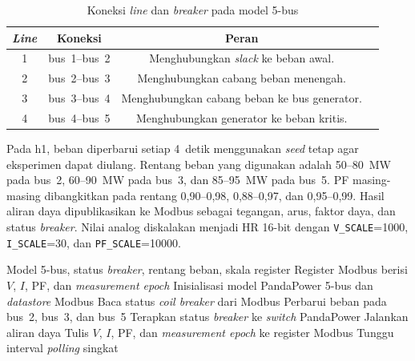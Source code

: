 \renewcommand{\arraystretch}{1.3}
\begin{table}[htbp]
    \centering
    \caption{Koneksi \textit{line} dan \textit{breaker} pada model 5-bus}
    \label{tab:line_model_5bus}
    \begin{tabular}{|c|c|c|c|}
        \hline
        \textbf{\textit{Line}} & \textbf{Koneksi} & \textbf{Peran} \\ \hline
        1 & bus~1--bus~2 & Menghubungkan \textit{slack} ke beban awal. \\ \hline
        2 & bus~2--bus~3 & Menghubungkan cabang beban menengah. \\ \hline
        3 & bus~3--bus~4 & Menghubungkan cabang beban ke bus generator. \\ \hline
        4 & bus~4--bus~5 & Menghubungkan generator ke beban kritis. \\ \hline
    \end{tabular}
\end{table}

Pada h1, beban diperbarui setiap 4~detik menggunakan \textit{seed} tetap agar eksperimen dapat diulang. Rentang beban yang digunakan adalah 50--80~MW pada bus~2, 60--90~MW pada bus~3, dan 85--95~MW pada bus~5. \ac{PF} masing-masing dibangkitkan pada rentang 0{,}90--0{,}98, 0{,}88--0{,}97, dan 0{,}95--0{,}99. Hasil aliran daya dipublikasikan ke Modbus sebagai tegangan, arus, faktor daya, dan status \textit{breaker}. Nilai analog diskalakan menjadi HR 16-bit dengan \texttt{V\_SCALE}=1000, \texttt{I\_SCALE}=30, dan \texttt{PF\_SCALE}=10000.

\begin{algorithm}[H]
\caption{Siklus simulasi lapangan pada h1}
\begin{compactalgorithmic}[1]
\Require Model 5-bus, status \textit{breaker}, rentang beban, skala register
\Ensure Register Modbus berisi $V$, $I$, PF, dan \textit{measurement epoch}
\State Inisialisasi model PandaPower 5-bus dan \textit{datastore} Modbus
\Loop
    \State Baca status \textit{coil breaker} dari Modbus
        \State Perbarui beban pada bus~2, bus~3, dan bus~5
        \State Terapkan status \textit{breaker} ke \textit{switch} PandaPower
        \State Jalankan aliran daya
        \State Tulis $V$, $I$, PF, dan \textit{measurement epoch} ke register Modbus
    \EndIf
    \State Tunggu interval \textit{polling} singkat
\EndLoop
\end{compactalgorithmic}
\end{algorithm}

